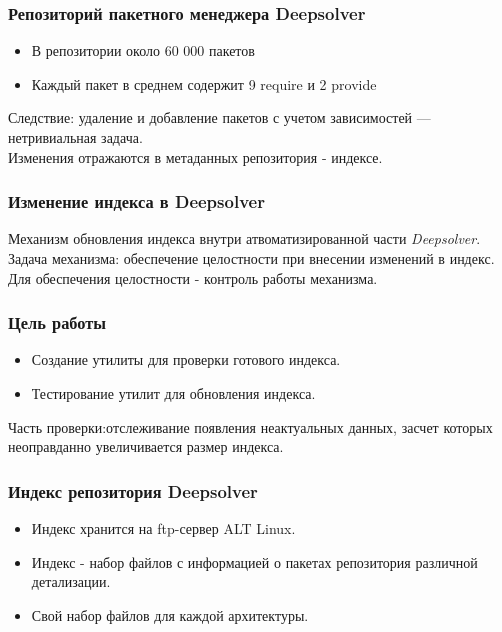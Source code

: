 \documentclass{beamer}
\begin{document}
\begin{frame}
\frametitle{Репозиторий пакетного менеджера Deepsolver}
\begin{itemize}
\item
В репозитории около 60 000 пакетов
\item
Каждый пакет в среднем содержит 9 require и 2 provide
\end{itemize}

Следствие: удаление и добавление пакетов с учетом зависимостей ---
нетривиальная задача.\\

Изменения отражаются в метаданных репозитория - индексе.
\end{frame}

\begin{frame}
\frametitle{Изменение индекса в Deepsolver}
Механизм обновления индекса внутри атвоматизированной части  \textit{Deepsolver}.\\
\vspace{0.5cm}
Задача механизма: обеспечение целостности при внесении изменений в индекс.\\
\vspace{0.5cm}
Для обеспечения целостности - контроль работы механизма.

\end{frame}

\begin{frame}
\frametitle{Цель работы}
\begin{itemize}
\item
Создание утилиты для проверки готового индекса.
\item
Тестирование утилит для обновления индекса.
\end{itemize}
\vspace{0.5cm}
Часть проверки:отслеживание появления
неактуальных данных, засчет которых неоправданно увеличивается размер индекса.
\end{frame}

\begin{frame}
\frametitle{Индекс репозитория Deepsolver}
\begin{itemize}
\item
Индекс хранится на ftp-сервер ALT Linux.
\item
Индекс - набор файлов с информацией о пакетах репозитория различной детализации.
\item
Свой набор файлов для каждой архитектуры.
\end{itemize}
\end{frame}
\end{document}
